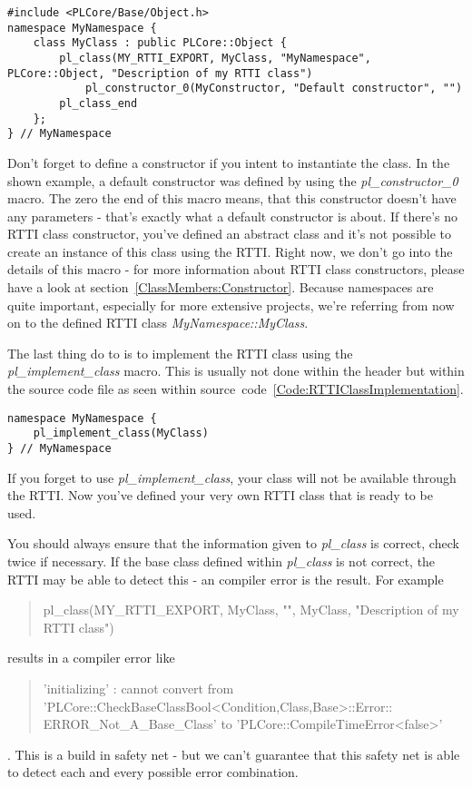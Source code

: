 \begin{lstlisting}[float=htb,label=Code:RTTIClassDefinitionWithNamespace,caption={Defining a new RTTI class with namespace}]
#include <PLCore/Base/Object.h>
namespace MyNamespace {
	class MyClass : public PLCore::Object {
		pl_class(MY_RTTI_EXPORT, MyClass, "MyNamespace", PLCore::Object, "Description of my RTTI class")
			pl_constructor_0(MyConstructor, "Default constructor", "")
		pl_class_end
	};
} // MyNamespace
\end{lstlisting}
Don't forget to define a constructor if you intent to instantiate the class. In the shown example, a default constructor was defined by using the \emph{pl\_constructor\_0} macro.  The zero the end of this macro means, that this constructor doesn't have any parameters - that's exactly what a default constructor is about. If there's no RTTI class constructor, you've defined an abstract class and it's not possible to create an instance of this class using the RTTI. Right now, we don't go into the details of this macro - for more information about RTTI class constructors, please have a look at section~\ref{ClassMembers:Constructor}. Because namespaces are quite important, especially for more extensive projects, we're referring from now on to the defined RTTI class \emph{MyNamespace::MyClass}.

The last thing do to is to implement the RTTI class using the \emph{pl\_implement\_class} macro. This is usually not done within the header but within the source code file as seen within source~code~\ref{Code:RTTIClassImplementation}.
\begin{lstlisting}[float=htb,label=Code:RTTIClassImplementation,caption={Implementing a new RTTI class}]
namespace MyNamespace {
	pl_implement_class(MyClass)
} // MyNamespace
\end{lstlisting}
If you forget to use \emph{pl\_implement\_class}, your class will not be available through the RTTI. Now you've defined your very own RTTI class that is ready to be used.

You should always ensure that the information given to \emph{pl\_class} is correct, check twice if necessary. If the base class defined within \emph{pl\_class} is not correct, the RTTI may be able to detect this - an compiler error is the result. For example \begin{quote}pl\_class(MY\_RTTI\_EXPORT, MyClass, "", MyClass, "Description of my RTTI class")\end{quote} results in a compiler error like \begin{quote}'initializing' : cannot convert from\\'PLCore::CheckBaseClassBool<Condition,Class,Base>::Error::\\ERROR\_Not\_A\_Base\_Class' to 'PLCore::CompileTimeError<false>'\end{quote}. This is a build in safety net - but we can't guarantee that this safety net is able to detect each and every possible error combination.


